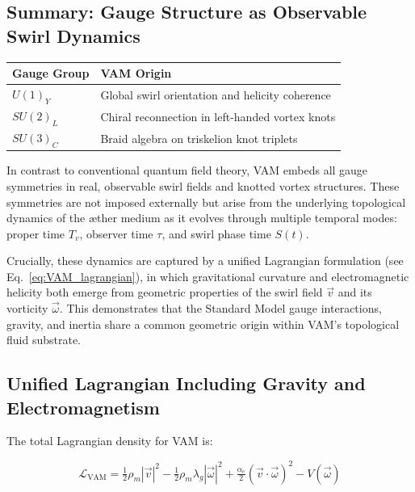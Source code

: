 \documentclass[preprint]{revtex4-2}
\begin{document}
    \subsection{Summary: Gauge Structure as Observable Swirl Dynamics}

    \begin{center}
    \begin{tabular}{ll}
    \toprule
    \textbf{Gauge Group} & \textbf{VAM Origin} \\
    \midrule
    \( U(1)_Y \) & Global swirl orientation and helicity coherence \\
    \( SU(2)_L \) & Chiral reconnection in left-handed vortex knots \\
    \( SU(3)_C \) & Braid algebra on triskelion knot triplets \\
    \bottomrule
    \end{tabular}
    \end{center}

     In contrast to conventional quantum field theory, VAM embeds all gauge symmetries in real, observable swirl fields and knotted vortex structures. These symmetries are not imposed externally but arise from the underlying topological dynamics of the æther medium as it evolves through multiple temporal modes: proper time \( T_v \), observer time \( \tau \), and swirl phase time \( S(t) \).

    Crucially, these dynamics are captured by a unified Lagrangian formulation (see Eq.~\eqref{eq:VAM_lagrangian}), in which gravitational curvature and electromagnetic helicity both emerge from geometric properties of the swirl field \( \vec{v} \) and its vorticity \( \vec{\omega} \). This demonstrates that the Standard Model gauge interactions, gravity, and inertia share a common geometric origin within VAM's topological fluid substrate.

      \subsection*{Unified Lagrangian Including Gravity and Electromagnetism}

        The total Lagrangian density for VAM is:

        \begin{equation}
        \mathcal{L}_{\text{VAM}} = \tfrac{1}{2} \rho_{\scriptscriptstyle\boldsymbol\!m} |\vec{v}|^2 - \tfrac{1}{2} \rho_{\scriptscriptstyle\boldsymbol\!m} \lambda_g |\vec{\omega}|^2 + \tfrac{\alpha_e}{2} (\vec{v} \cdot \vec{\omega})^2 - V(\vec{\omega})
        \label{eq:VAM_lagrangian}
        \end{equation}
\end{document}
